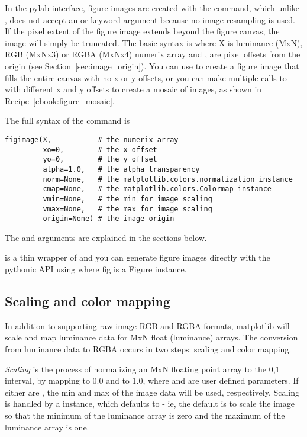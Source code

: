\documentclass[twoside]{book}
\begin{document}
In the pylab interface, figure images are created with the
 command, which unlike , does not
accept an  or  keyword argument
because no image resampling is used.  If the pixel extent of the
figure image extends beyond the figure canvas, the image will simply
be truncated.  The basic syntax is 
where X is luminance (MxN), RGB (MxNx3) or RGBA (MxNx4) numerix array
and ,  are pixel offsets from the origin (see
Section~\ref{sec:image_origin}).  You can use  to create a
figure image that fills the entire canvas with no x or y offsets, or
you can make multiple calls to  with different x and
y offsets to create a mosaic of images, as shown in
Recipe~\ref{cbook:figure_mosaic}.

The full syntax of the  command is

\begin{lstlisting}
figimage(X,           # the numerix array
         xo=0,        # the x offset
         yo=0,        # the y offset
         alpha=1.0,   # the alpha transparency
         norm=None,   # the matplotlib.colors.normalization instance
         cmap=None,   # the matplotlib.colors.Colormap instance
         vmin=None,   # the min for image scaling 
         vmax=None,   # the max for image scaling 
         origin=None) # the image origin
\end{lstlisting}

The  and  arguments are
explained in the sections below.

 is a thin wrapper of
 and you can generate figure images
directly with the pythonic API using  where
fig is a Figure instance.

\subsection{Scaling and color mapping}
\label{sec:image_to_rgba}

In addition to supporting raw image RGB and RGBA formats, matplotlib
will scale and map luminance data for MxN float (luminance) arrays.
The conversion from luminance data to RGBA occurs in two steps:
scaling and color mapping.

\textit{Scaling} is the process of normalizing an MxN floating point
array to the 0,1 interval, by mapping  to 0.0 and
 to 1.0, where  and  are user defined
parameters.  If either are , the min and max of the image
data will be used, respectively.  Scaling is handled by a
 instance, which defaults to
 - ie, the default is to
scale the image so that the minimum of the luminance array is zero and
the maximum of the luminance array is one. 
\end{document}
